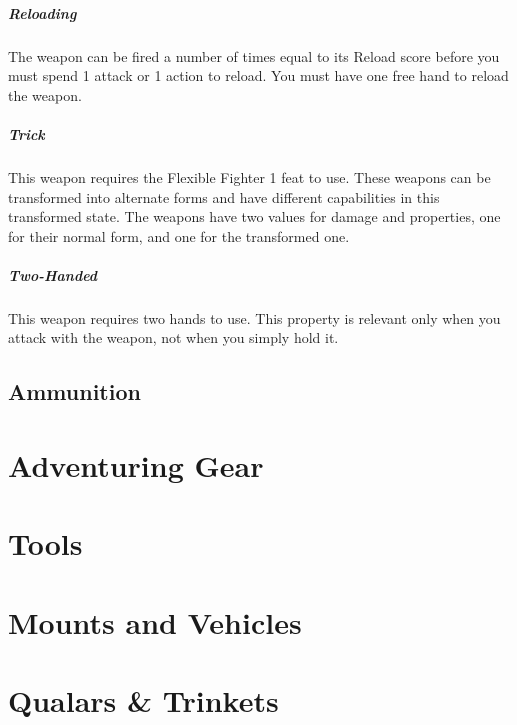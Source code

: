     \subparagraph{Reloading} The weapon can be fired a number of times equal to its Reload score before you must spend 1 attack or 1 action to reload.
    You must have one free hand to reload the weapon.

    \subparagraph{Trick} This weapon requires the Flexible Fighter 1 feat to use.
    These weapons can be transformed into alternate forms and have different capabilities in this transformed state.
    The weapons have two values for damage and properties, one for their normal form, and one for the transformed one.

    \subparagraph{Two-Handed} This weapon requires two hands to use.
    This property is relevant only when you attack with the weapon, not when you simply hold it.

\subsection*{Ammunition} \label{ssec::ammunition}

\section{Adventuring Gear} \label{sec::adventuring}
\section{Tools} \label{sec::tools}
\section{Mounts and Vehicles} \label{sec::adventuring}
\section{Qualars \& Trinkets} \label{sec::trinkets}
